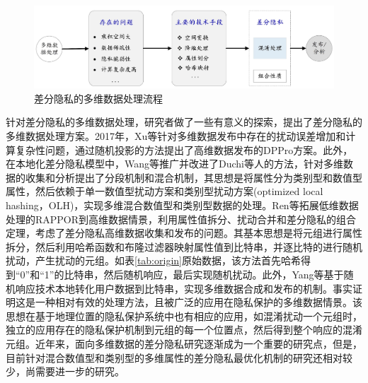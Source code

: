 \begin{figure}[htbp]
	\centering
	\includegraphics[width = 0.85\linewidth]{./figures/chapter02_4.jpg}
	\caption{差分隐私的多维数据处理流程}
	\label{fig:chapter02-multidimension-data}
\end{figure}

针对差分隐私的多维数据处理，研究者做了一些有意义的探索，提出了差分隐私的多维数据处理方案。2017年，Xu等\cite{xu2017dppro}针对多维数据发布中存在的扰动误差增加和计算复杂性问题，通过随机投影的方法提出了高维数据发布的DPPro方案。此外，在本地化差分隐私模型中，Wang等\cite{wang2019collecting}推广并改进了Duchi等人\cite{duchi2018minimax}的方法，针对多维数据的收集和分析提出了分段机制和混合机制，其思想是将属性分为类别型和数值型属性，然后依赖于单一数值型扰动方案和类别型扰动方案(optimized local hashing，OLH)，实现多维混合数值型和类别型数据的处理。Ren等\cite{ren2018textsf}拓展低维数据处理的RAPPOR到高维数据情景，利用属性值拆分、扰动合并和差分隐私的组合定理\cite{kairouz2017the}，考虑了差分隐私高维数据收集和发布的问题。其基本思想是将元组进行属性拆分，然后利用哈希函数和布隆过滤器映射属性值到比特串，并逐比特的进行随机扰动，产生扰动的元组。如表\ref{tab:origin}原始数据，该方法首先哈希得到``0''和``1''的比特串，然后随机响应，最后实现随机扰动。此外，Yang等\cite{yang2017copula}基于随机响应技术本地转化用户数据到比特串，实现多维数据合成和发布的机制。事实证明这是一种相对有效的处理方法，且被广泛的应用在隐私保护的多维数据情景。该思想在基于地理位置的隐私保护系统中也有相应的应用，如混淆扰动一个元组时，独立的应用存在的隐私保护机制到元组的每一个位置点，然后得到整个响应的混淆元组\cite{andres2013geo}。近年来，面向多维数据的差分隐私研究逐渐成为一个重要的研究点，但是，目前针对混合数值型和类别型的多维属性的差分隐私最优化机制的研究还相对较少，尚需要进一步的研究。

